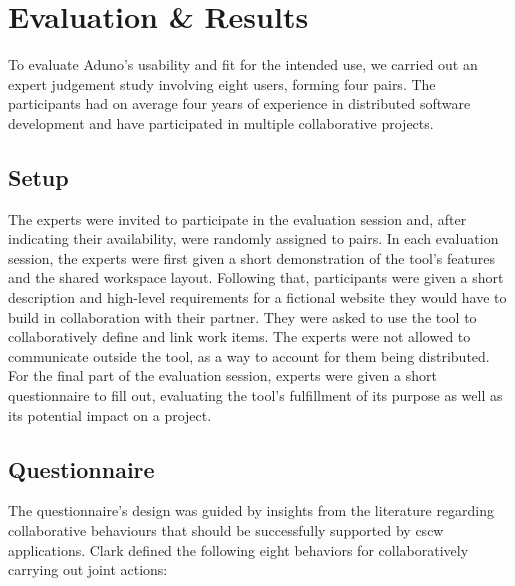 \documentclass[conference]{IEEEtran}
\begin{document}
\section{Evaluation \& Results}
\label{sec:evaluation}

To evaluate Aduno's usability and fit for the intended use, we carried out an expert judgement study involving eight users, forming four pairs. The participants had on average four years of experience in distributed software development and have participated in multiple collaborative projects.


\subsection{Setup}
The experts were invited to participate in the evaluation session and, after indicating their availability, were randomly assigned to pairs. In each evaluation session, the experts were first given a short demonstration of the tool's features and the shared workspace layout. Following that, participants were given a short description and high-level requirements for a fictional website they would have to build in collaboration with their partner. They were asked to use the tool to collaboratively define and link work items. The experts were not allowed to communicate outside the tool, as a way to account for them being distributed. For the final part of the evaluation session, experts were given a short questionnaire to fill out, evaluating the tool's fulfillment of its purpose as well as its potential impact on a project.

\subsection{Questionnaire}
The questionnaire's design was guided by insights from the literature regarding collaborative behaviours that should be successfully supported by {\sc cscw} applications. Clark \cite{Clark96} defined the following eight behaviors for collaboratively carrying out joint actions:
\end{document}

